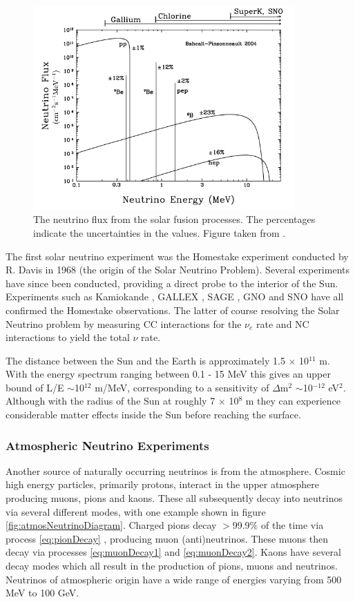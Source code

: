 \begin{figure}[htbp]
\begin{center}
\includegraphics[width=100mm]{Introduction/IntroductionFigs/solarFlux.png}
\caption{The neutrino flux from the solar fusion processes. The percentages indicate the uncertainties in the values. Figure taken from \cite{SolarFlux}.}
\label{fig:solarNeutrinoFlux}
\end{center}
\end{figure}
The first solar neutrino experiment was the Homestake experiment conducted by R. Davis in 1968 \cite{Solar} (the origin of the Solar Neutrino Problem). Several experiments have since been conducted, providing a direct probe to the interior of the Sun. Experiments such as Kamiokande \cite{kamiokandeExperiment}, GALLEX \cite{gallexExperiment}, SAGE \cite{sageExperiment}, GNO \cite{gnoExperiment} and SNO \cite{snoExperiment} have all confirmed the Homestake observations. The latter of course resolving the Solar Neutrino problem by measuring CC interactions for the $\nu_{e}$ rate and NC interactions to yield the total $\nu$ rate.

The distance between the Sun and the Earth is approximately 1.5 $\times$ 10$^{11}$ m. With the energy spectrum ranging between 0.1 - 15 MeV this gives an upper bound of L/E $\sim$10$^{12}$ m/MeV, corresponding to a sensitivity of $\Delta$m$^{2}$ $\sim$10$^{-12}$ eV$^{2}$. Although with the radius of the Sun at roughly 7 $\times$ 10$^{8}$ m they can experience considerable matter effects inside the Sun before reaching the surface. 

\subsubsection{Atmospheric Neutrino Experiments}
Another source of naturally occurring neutrinos is from the atmosphere. Cosmic high energy particles, primarily protons, interact in the upper atmosphere producing muons, pions and kaons. These all subsequently decay into neutrinos via several different modes, with one example shown in figure \ref{fig:atmosNeutrinoDiagram}. Charged pions decay $>$99.9\% of the time via process \ref{eq:pionDecay} \cite{pionDecayModes}, producing muon (anti)neutrinos. These muons then decay via processes \ref{eq:muonDecay1} and \ref{eq:muonDecay2}. Kaons have several decay modes which all result in the production of pions, muons and neutrinos. Neutrinos of atmospheric origin have a wide range of energies varying from 500 MeV to 100 GeV.

